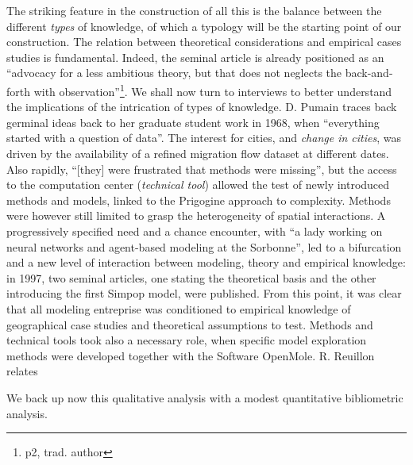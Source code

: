 \documentclass[runningheads,a4paper]{llncs2e/llncs}
\begin{document}
The striking feature in the construction of all this is the balance between the different \emph{types} of knowledge, of which a typology will be the starting point of our construction. The relation between theoretical considerations and empirical cases studies is fundamental. Indeed, the seminal article \cite{pumain1997pour} is already positioned as an ``advocacy for a less ambitious theory, but that does not neglects the back-and-forth with observation''\footnote{p2, trad. author}. We shall now turn to interviews to better understand the implications of the intrication of types of knowledge. D. Pumain traces back germinal ideas back to her graduate student work in 1968, when ``everything started with a question of data''. The interest for cities, and \emph{change in cities}, was driven by the availability of a refined migration flow dataset at different dates. Also rapidly, ``[they] were frustrated that methods were missing'', but the access to the computation center (\emph{technical tool}) allowed the test of newly introduced methods and models, linked to the Prigogine approach to complexity. %
Methods were however still limited to grasp the heterogeneity of spatial interactions. A progressively specified need and a chance encounter, with ``a lady working on neural networks and agent-based modeling at the Sorbonne'', led to a bifurcation and a new level of interaction between modeling, theory and empirical knowledge: in 1997, two seminal articles, one stating the theoretical basis and the other introducing the first Simpop model, were published. From this point, it was clear that all modeling entreprise was conditioned to empirical knowledge of geographical case studies and theoretical assumptions to test. Methods and technical tools took also a necessary role, when specific model exploration methods were developed together with the Software OpenMole. R. Reuillon relates 



We back up now this qualitative analysis with a modest quantitative bibliometric analysis.
\end{document}
